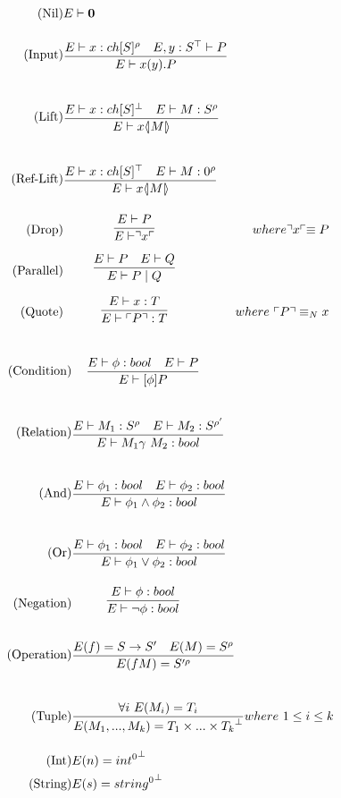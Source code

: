\begin{align*}
\tag{Nil} &E \vdash \nil\\
\tag{Input} &\infrule{E\vdash x:ch[S]^\rho\quad E,y:S^\top\vdash P}{E \vdash \inp{x}{y}P}\\
\tag{Lift} &\infrule{E\vdash x:ch[S]^\bot\quad E \vdash M:S^\rho}{E\vdash \lift{x}{M}}\\
\tag{Ref-Lift} &\infrule{E\vdash x:ch[S]^\top\quad E \vdash M:0^\rho}{E\vdash \lift{x}{M}}\\
\tag{Drop} &\infrule{E \vdash P}{E\vdash \drop{x}}& where \drop{x} \equiv P\\
\tag{Parallel} &\infrule{E\vdash P \quad E \vdash Q}{E \vdash P \para Q}\\
\tag{Quote} &\infrule{E \vdash x:T}{E\vdash \quot{P}:T}& where\ \quot{P} \equiv_N x
\end{align*}

\begin{align*}
\tag{Condition} &\infrule{E\vdash \phi:bool\quad E\vdash P}{E \vdash [\phi] P}\\
\tag{Relation} &\infrule{E\vdash M_1:S^\rho \quad E\vdash M_2:S^{\rho'}}{E\vdash M_1 \gamma\ M_2:bool}\\
\tag{And} &\infrule{E\vdash \phi _1:bool \quad E\vdash \phi _2:bool}{E\vdash \phi _1 \land \phi _2:bool}\\
\tag{Or} &\infrule{E\vdash \phi _1:bool \quad E\vdash \phi _2:bool}{E\vdash \phi _1 \lor \phi _2:bool}\\
\tag{Negation} &\infrule{E\vdash \phi :bool }{E\vdash \neg \phi :bool}\\
\tag{Operation} &\infrule{E(f)=S\ra S'\quad E(M)=S^\rho}{E(fM)=S'^\rho}\\
\tag{Tuple} &\infrule{\forall i\ E(M_i) = T_i}{E(M_1,...,M_k)={T_1\times...\times T_k}^\bot}& where\ 1\leq i\leq k\\
\tag{Int} &E(n)={int^0}^\bot\\
\tag{String} &E(s)={string^0}^\bot\\
\end{align*}


